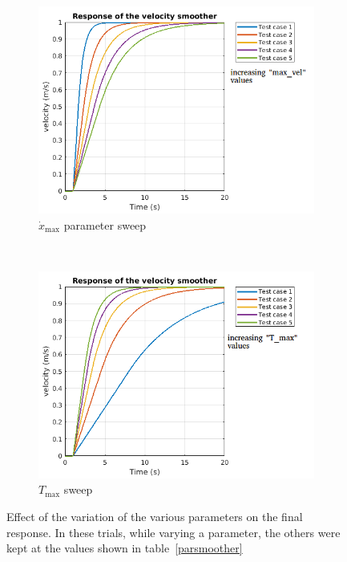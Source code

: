 \begin{figure}[h]
\begin{subfigure}{6cm}
		\includegraphics[width=0.95\columnwidth]{images/03-foundation/maxvel}
		\caption{$\dot{x}_{\text{max}}$ parameter sweep}
		\label{sit3} 
	\end{subfigure}
	~
	\begin{subfigure}{6cm}
	    \centering
		\includegraphics[width=0.95\columnwidth]{images/03-foundation/Tmaxsweep}
		\caption{$T_{\text{max}}$ sweep}
		\label{sit4}
	\end{subfigure}
	\label{param1}
	\caption{Effect of the variation of the various parameters on the final response. In these trials, while varying a parameter, the others were kept at the values shown in table~\ref{parsmoother}}
\end{figure}

